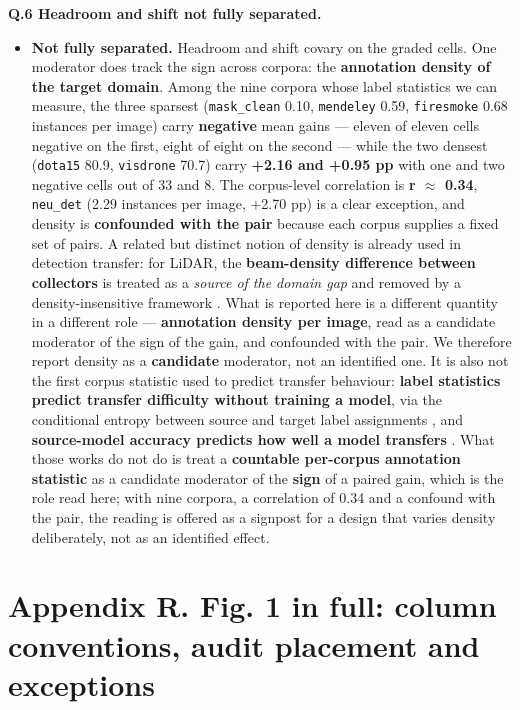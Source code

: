 \documentclass[pdflatex,sn-mathphys-ay]{sn-jnl}
\begin{document}
\textbf{Q.6 Headroom and shift not fully separated.}

\begin{itemize}
\item \textbf{Not fully separated.} Headroom and shift covary on the graded cells. One moderator does track the sign across corpora: the \textbf{annotation density of the target domain}. Among the nine corpora whose label statistics we can measure, the three sparsest (\texttt{mask\_clean} 0.10, \texttt{mendeley} 0.59, \texttt{firesmoke} 0.68 instances per image) carry \textbf{negative} mean gains --- eleven of eleven cells negative on the first, eight of eight on the second --- while the two densest (\texttt{dota15} 80.9, \texttt{visdrone} 70.7) carry \textbf{+2.16 and +0.95 pp} with one and two negative cells out of 33 and 8. The corpus-level correlation is \textbf{r \ensuremath{\approx} 0.34}, \texttt{neu\_det} (2.29 instances per image, +2.70 pp) is a clear exception, and density is \textbf{confounded with the pair} because each corpus supplies a fixed set of pairs. A related but distinct notion of density is already used in detection transfer: for LiDAR, the \textbf{beam-density difference between collectors} is treated as a \emph{source of the domain gap} and removed by a density-insensitive framework \citep{hu2023}. What is reported here is a different quantity in a different role --- \textbf{annotation density per image}, read as a candidate moderator of the sign of the gain, and confounded with the pair. We therefore report density as a \textbf{candidate} moderator, not an identified one. It is also not the first corpus statistic used to predict transfer behaviour: \textbf{label statistics predict transfer difficulty without training a model}, via the conditional entropy between source and target label assignments \citep{tran2019}, and \textbf{source-model accuracy predicts how well a model transfers} \citep{kornblith2019}. What those works do not do is treat a \textbf{countable per-corpus annotation statistic} as a candidate moderator of the \textbf{sign} of a paired gain, which is the role read here; with nine corpora, a correlation of 0.34 and a confound with the pair, the reading is offered as a signpost for a design that varies density deliberately, not as an identified effect.
\end{itemize}

\section*{Appendix R. Fig. 1 in full: column conventions, audit placement and exceptions}
\end{document}
